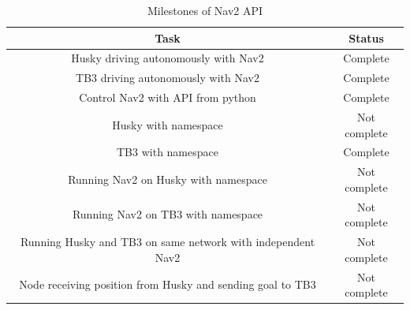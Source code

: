 \begin{table}[H]
    \centering
    \begin{tabular}{c|c}
        Task                                                        & Status   \\ \hline
        Husky driving autonomously with Nav2                        & Complete \\
        TB3 driving autonomously with Nav2                          & Complete \\
        Control Nav2 with API from python                           & Complete \\
        Husky with namespace                                        & Not complete \\
        TB3 with namespace                                          & Complete \\
        Running Nav2 on Husky with namespace                        & Not complete \\
        Running Nav2 on TB3 with namespace                          & Not complete \\
        Running Husky and TB3 on same network with independent Nav2 & Not complete\\
        Node receiving position from Husky and sending goal to TB3  & Not complete \\
    \end{tabular}
    \caption{Milestones of Nav2 API}
    \label{tab:MilestonesNav2API}
\end{table}
   


